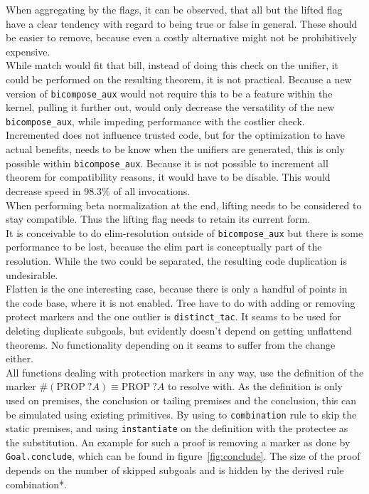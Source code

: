 When aggregating by the flags, it can be observed, that all but the lifted flag have a clear tendency with regard to being true or false in general. These should be easier to remove, because even a costly alternative might not be prohibitively expensive.\\
While match would fit that bill, instead of doing this check on the unifier, it could be performed on the resulting theorem, it is not practical. Because a new version of \texttt{bicompose\_aux} would not require this to be a feature within the kernel, pulling it further out, would only decrease the versatility of the new \texttt{bicompose\_aux}, while impeding performance with the costlier check.\\
Incremented does not influence trusted code, but for the optimization to have actual benefits, needs to be know when the unifiers are generated, this is only possible within \texttt{bicompose\_aux}. Because it is not possible to increment all theorem for compatibility reasons, it would have to be disable. This would decrease speed in 98.3\% of all invocations.\\
When performing beta normalization at the end, lifting needs to be considered to stay compatible. Thus the lifting flag needs to retain its current form.\\
It is conceivable to do elim-resolution outside of \texttt{bicompose\_aux} but there is some performance to be lost, because the elim part is conceptually part of the resolution. While the two could be separated, the resulting code duplication is undesirable.\\
Flatten is the one interesting case, because there is only a handful of points in the code base, where it is not enabled. Tree have to do with adding or removing protect markers and the one outlier is \texttt{distinct\_tac}. It seams to be used for deleting duplicate subgoals, but evidently doesn't depend on getting unflattend theorems. No functionality depending on it seams to suffer from the change either.\\
All functions dealing with protection markers in any way, use the definition of the marker $\#(\text{PROP}~?A) \equiv \text{PROP}~?A$ to resolve with. As the definition is only used on premises, the conclusion or tailing premises and the conclusion, this can be simulated using existing primitives. By using to \texttt{combination} rule to skip the static premises, and using \texttt{instantiate} on the definition with the protectee as the substitution. An example for such a proof is removing a marker as done by \texttt{Goal.conclude}, which can be found in figure~\ref{fig:conclude}. The size of the proof depends on the number of skipped subgoals and is hidden by the derived rule combination*.

